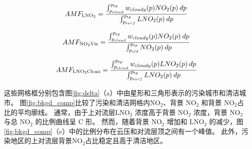 \begin{equation} \label{AMFLNO2_crf100}
AMF_{\textrm{LNO$_2$}} = \frac{\int_{p_{\textrm cloud}}^{p_{\textrm tp}} w_{\textrm cloudy}(p) NO_2(p) \: dp}{\int_{p_{\textrm surf}}^{p_{\textrm tp}} LNO_2(p) \: dp}
\end{equation}

\begin{equation} \label{AMFNO2Vis_crf100}
AMF_{\textrm{NO$_2$Vis}} = \frac{\int_{p_{\textrm cloud}}^{p_{\textrm tp}} w_{\textrm cloudy}(p) NO_2(p) \: dp}{\int_{p_{\textrm cld}}^{p_{\textrm tp}} NO_2(p) \: dp}
\end{equation}

\begin{equation} \label{AMFLNO2Clean_crf100}
AMF_{\textrm{LNO$_2$Clean}} = \frac{\int_{p_{\textrm cloud}}^{p_{\textrm tp}} w_{\textrm cloudy}(p) LNO_2(p) \: dp}{\int_{p_{\textrm surf}}^{p_{\textrm tp}} LNO_2(p) \: dp}
\end{equation}

这些网格框分别包含图\ref{fig:delta}（a）中由星形和三角形表示的污染城市和清洁城市。
图\ref{fig:bkgd_comp}比较了污染和清洁网格内NO$_2$、背景 NO$_2$ 和背景 NO$_2$占比的平均廓线。
通常，由于上对流层LNO$_2$ 浓度高于背景 NO$_2$ 浓度，背景 NO$_2$ 与总 NO$_2$ 的比例曲线呈 C 形。
然而，随着背景 NO$_2$ 增加和 LNO$_2$ 的减少，图\ref{fig:bkgd_comp}（e）中的比例分布在云压和对流层顶之间有一个峰值。
此外，污染地区的上对流层背景NO$_2$占比稳定且高于清洁地区。

